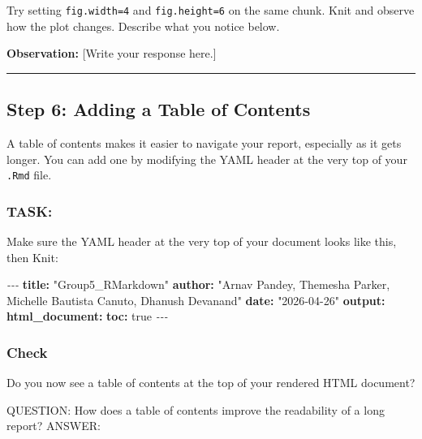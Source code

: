 \documentclass[
]{article}
\newenvironment{Shaded}{\begin{snugshade}}{\end{snugshade}}
\newcommand{\AttributeTok}[1]{\textcolor[rgb]{0.13,0.29,0.53}{#1}}
\newcommand{\CharTok}[1]{\textcolor[rgb]{0.31,0.60,0.02}{#1}}
\newcommand{\FunctionTok}[1]{\textcolor[rgb]{0.13,0.29,0.53}{\textbf{#1}}}
\newcommand{\KeywordTok}[1]{\textcolor[rgb]{0.13,0.29,0.53}{\textbf{#1}}}
\newcommand{\PreprocessorTok}[1]{\textcolor[rgb]{0.56,0.35,0.01}{\textit{#1}}}
\newcommand{\StringTok}[1]{\textcolor[rgb]{0.31,0.60,0.02}{#1}}
\begin{document}
Try setting \texttt{fig.width=4} and \texttt{fig.height=6} on the same
chunk. Knit and observe how the plot changes. Describe what you notice
below.

\textbf{Observation:} {[}Write your response here.{]}

\begin{center}\rule{0.5\linewidth}{0.5pt}\end{center}

\subsection{Step 6: Adding a Table of
Contents}\label{step-6-adding-a-table-of-contents}

A table of contents makes it easier to navigate your report, especially
as it gets longer. You can add one by modifying the YAML header at the
very top of your \texttt{.Rmd} file.

\subsubsection{TASK:}\label{task-15}

Make sure the YAML header at the very top of your document looks like
this, then Knit:

\begin{Shaded}
\begin{Highlighting}[]
\PreprocessorTok{{-}{-}{-}}
\FunctionTok{title}\KeywordTok{:}\AttributeTok{ }\StringTok{"Group5\_RMarkdown"}
\FunctionTok{author}\KeywordTok{:}\AttributeTok{ }\StringTok{"Arnav Pandey, Themesha Parker, Michelle Bautista Canuto, Dhanush Devanand"}
\FunctionTok{date}\KeywordTok{:}\AttributeTok{ }\StringTok{"2026{-}04{-}26"}
\FunctionTok{output}\KeywordTok{:}
\AttributeTok{  }\FunctionTok{html\_document}\KeywordTok{:}
\AttributeTok{    }\FunctionTok{toc}\KeywordTok{:}\AttributeTok{ }\CharTok{true}
\PreprocessorTok{{-}{-}{-}}
\end{Highlighting}
\end{Shaded}

\subsubsection{Check}\label{check-6}

Do you now see a table of contents at the top of your rendered HTML
document?

QUESTION: How does a table of contents improve the readability of a long
report? ANSWER:
\end{document}

